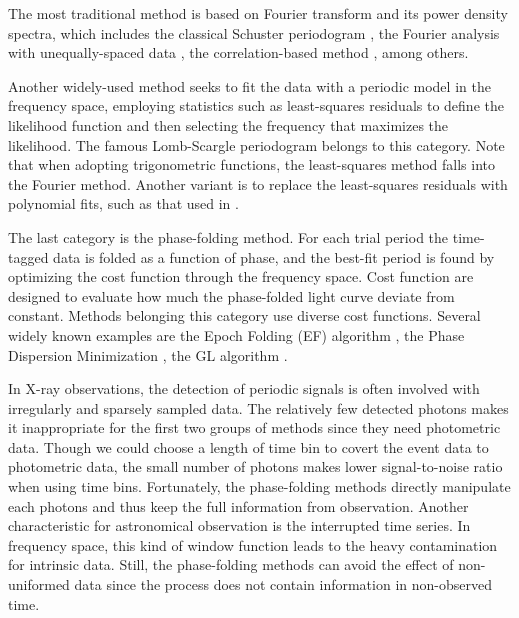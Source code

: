 \documentclass[twoside,twocolumn]{aastex63}
\begin{document}
The most traditional method is based on Fourier transform and its power density spectra, which includes the classical Schuster periodogram \citep{1898TeMag...3...13S}, the Fourier analysis with unequally-spaced data \citep{1975Ap&SS..36..137D}, the correlation-based method \citep{1988ApJ...333..646E}, among others.

Another widely-used method seeks to fit the data with a periodic model in the frequency space, employing statistics such as least-squares residuals to define the likelihood function and then selecting the frequency that maximizes the likelihood. The famous Lomb-Scargle periodogram \citep[hereafter LS]{1976Ap&SS..39..447L,1982ApJ...263..835S} belongs to this category. Note that when adopting trigonometric functions, the least-squares method falls into the Fourier method. Another variant is to replace the least-squares residuals with polynomial fits, such as that used in \citet{1996ApJ...460L.107S}.

The last category is the phase-folding method. For each trial period the time-tagged data is folded as a function of phase, and the best-fit period is found by optimizing the cost function through the frequency space. Cost function are designed  to evaluate how much the phase-folded light curve deviate from constant.
Methods belonging this category use diverse cost functions. Several widely known examples are the Epoch Folding (EF) algorithm \citep{1983ApJ...266..160L}, the Phase Dispersion Minimization \citep{1978ApJ...224..953S}, the GL algorithm \citep{1992ApJ...398..146G}.

In X-ray observations, the detection of periodic signals is often involved with irregularly and sparsely sampled data. The relatively few detected photons makes it inappropriate for the first two groups of methods since they need photometric data. Though we could choose a length of time bin to covert the event data to photometric data, the small number of photons makes lower signal-to-noise ratio when using time bins. Fortunately, the phase-folding methods directly manipulate each photons and thus keep the full information from observation. Another characteristic for astronomical observation is the interrupted time series. In frequency space, this kind of window function leads to the heavy contamination for intrinsic data. Still, the phase-folding methods can avoid the effect of non-uniformed data since the process does not contain information in non-observed time. 
\end{document}
